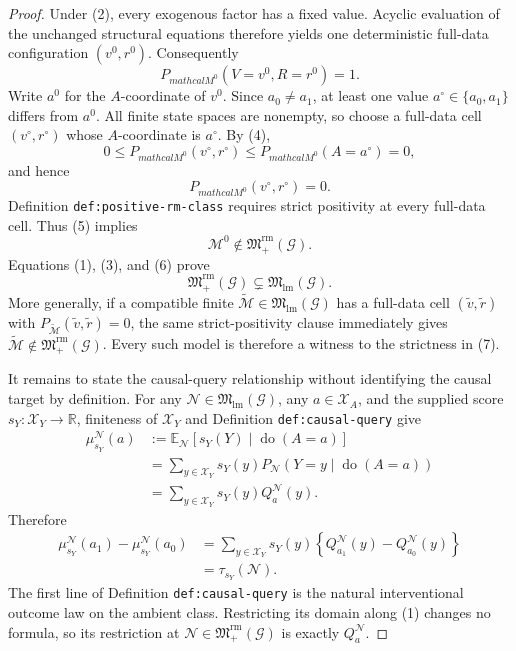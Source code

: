 \documentclass{article}
\begin{document}
\begin{proof}
Under (2), every exogenous factor has a fixed value.  Acyclic evaluation of the unchanged structural equations therefore yields one deterministic full-data configuration \((v^0,r^0)\).  Consequently
\[
P_{mathcal M^0}(V=v^0,R=r^0)=1.
\tag{4}
\]
Write \(a^0\) for the \(A\)-coordinate of \(v^0\).  Since \(a_0\ne a_1\), at least one value \(a^\circ\in\{a_0,a_1\}\) differs from \(a^0\).  All finite state spaces are nonempty, so choose a full-data cell \((v^\circ,r^\circ)\) whose \(A\)-coordinate is \(a^\circ\).  By (4),
\[
0\le P_{mathcal M^0}(v^\circ,r^\circ)
\le P_{mathcal M^0}(A=a^\circ)=0,
\]
and hence
\[
P_{mathcal M^0}(v^\circ,r^\circ)=0.
\tag{5}
\]
Definition \texttt{def:positive-rm-class} requires strict positivity at every full-data cell.  Thus (5) implies
\[
\mathcal M^0\notin\mathfrak M_{+}^{\mathrm{rm}}(\mathcal G).
\tag{6}
\]
Equations (1), (3), and (6) prove
\[
\mathfrak M_{+}^{\mathrm{rm}}(\mathcal G)
\subsetneq
\mathfrak M_{\mathrm{lm}}(\mathcal G).
\tag{7}
\]
More generally, if a compatible finite \(\widetilde{\mathcal M}\in\mathfrak M_{\mathrm{lm}}(\mathcal G)\) has a full-data cell \((\widetilde v,\widetilde r)\) with \(P_{\widetilde{\mathcal M}}(\widetilde v,\widetilde r)=0\), the same strict-positivity clause immediately gives \(\widetilde{\mathcal M}\notin\mathfrak M_{+}^{\mathrm{rm}}(\mathcal G)\).  Every such model is therefore a witness to the strictness in (7).

It remains to state the causal-query relationship without identifying the causal target by definition.  For any \(\mathcal N\in\mathfrak M_{\mathrm{lm}}(\mathcal G)\), any \(a\in\mathcal X_A\), and the supplied score \(s_Y:\mathcal X_Y\to\mathbb R\), finiteness of \(\mathcal X_Y\) and Definition \texttt{def:causal-query} give
\[
\begin{aligned}
\mu_{s_Y}^{\mathcal N}(a)
&:=\mathbb E_{\mathcal N}\!\left[s_Y(Y)\mid\operatorname{do}(A=a)\right]\\
&=\sum_{y\in\mathcal X_Y}s_Y(y)
P_{\mathcal N}\!\left(Y=y\mid\operatorname{do}(A=a)\right)\\
&=\sum_{y\in\mathcal X_Y}s_Y(y)Q_a^{\mathcal N}(y).
\end{aligned}
\tag{8}
\]
Therefore
\[
\begin{aligned}
\mu_{s_Y}^{\mathcal N}(a_1)-\mu_{s_Y}^{\mathcal N}(a_0)
&=\sum_{y\in\mathcal X_Y}s_Y(y)
\left\{Q_{a_1}^{\mathcal N}(y)-Q_{a_0}^{\mathcal N}(y)\right\}\\
&=\tau_{s_Y}(\mathcal N).
\end{aligned}
\tag{9}
\]
The first line of Definition \texttt{def:causal-query} is the natural interventional outcome law on the ambient class.  Restricting its domain along (1) changes no formula, so its restriction at \(\mathcal N\in\mathfrak M_{+}^{\mathrm{rm}}(\mathcal G)\) is exactly \(Q_a^{\mathcal N}\).


\end{proof}
\end{document}
